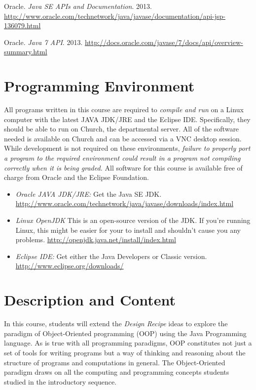 \documentclass[10pt]{article}
\begin{document}
Oracle. \textit{Java SE APIs and Documentation}. 2013.
\newline
\url{http://www.oracle.com/technetwork/java/javase/documentation/api-jsp-136079.html}
\vspace{.25in}

Oracle. \textit{Java 7 API}. 2013.
\newline
\url{http://docs.oracle.com/javase/7/docs/api/overview-summary.html}


\section{Programming Environment}

All programs written in this course are required to \emph{compile and run} on a Linux computer with the latest JAVA JDK/JRE and the Eclipse IDE\@.  Specifically, they should be able to run on Church, the departmental server.  All of the software needed is available on Church and can be accessed via a VNC desktop session. While development is not required on these environments, \emph{failure to properly port a program to the required environment could result in a program not compiling correctly when it is being graded.}  All software for this course is available free of charge from Oracle and the Eclipse Foundation.
\begin{itemize}
\item \emph{Oracle JAVA JDK/JRE:}  Get the Java SE JDK\@.
\newline \url{http://www.oracle.com/technetwork/java/javase/downloads/index.html}
\item \textit{Linux OpenJDK} This is an open-source version of the JDK\@.  If you're running Linux, this might be easier for your to install and shouldn't cause you any problems.\newline
\url{http://openjdk.java.net/install/index.html}
\item \emph{Eclipse IDE:} Get either the Java Developers or Classic version. \newline
\url{http://www.eclipse.org/downloads/}
\end{itemize}


\section{Description and Content}

In this course, students will extend the \textit{Design Recipe} ideas to explore the paradigm of Object-Oriented programming (OOP) using the Java Programming language.  As is true with all programming paradigms, OOP constitutes not just a set of tools for writing programs but a way of thinking and reasoning about the structure of programs and computations in general.   The Object-Oriented paradigm draws on all the computing and programming concepts students studied in the introductory sequence.
\end{document}
